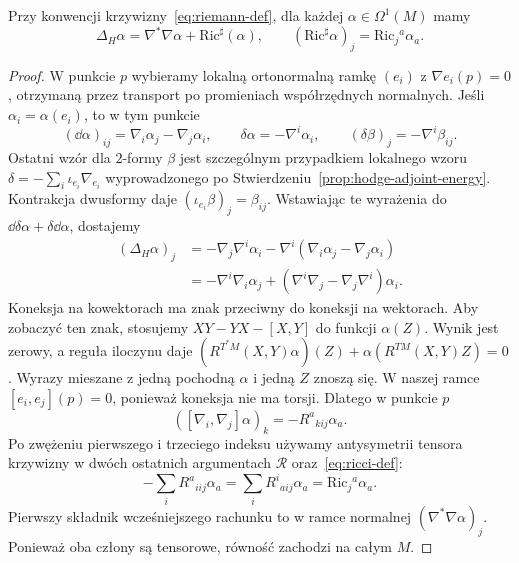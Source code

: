 \begin{twierdzenie}
\label{thm:weitzenbock-one-forms}
Przy konwencji krzywizny~\eqref{eq:riemann-def},
dla każdej $\alpha\in\Omega^1(M)$ mamy
\begin{equation}\label{eq:weitzenbock-one-forms}
 \Delta_H\alpha=\nabla^*\nabla\alpha
                      +\mathrm{Ric}^{\sharp}(\alpha),
 \qquad
 (\mathrm{Ric}^{\sharp}\alpha)_j
   =\mathrm{Ric}_j{}^a\alpha_a.
\end{equation}
\end{twierdzenie}
\begin{proof}
W punkcie $p$ wybieramy lokalną ortonormalną ramkę
$(e_i)$ z $\nabla e_i(p)=0$, otrzymaną przez transport
po promieniach współrzędnych normalnych.
Jeśli
$\alpha_i=\alpha(e_i)$, to w tym punkcie
\[
 (\dd\alpha)_{ij}=\nabla_i\alpha_j-\nabla_j\alpha_i,
 \qquad \delta\alpha=-\nabla^i\alpha_i,
 \qquad (\delta\beta)_j=-\nabla^i\beta_{ij}.
\]
Ostatni wzór dla $2$-formy $\beta$ jest szczególnym przypadkiem
lokalnego wzoru $\delta=-\sum_i\iota_{e_i}\nabla_{e_i}$
wyprowadzonego po Stwierdzeniu~\ref{prop:hodge-adjoint-energy}.
Kontrakcja dwusformy daje $(\iota_{e_i}\beta)_j=\beta_{ij}$.
Wstawiając te wyrażenia do
$\dd\delta\alpha+\delta\dd\alpha$, dostajemy
\begin{align*}
 (\Delta_H\alpha)_j
 &=-\nabla_j\nabla^i\alpha_i
   -\nabla^i(\nabla_i\alpha_j-\nabla_j\alpha_i)\\
 &=-\nabla^i\nabla_i\alpha_j
   +(\nabla^i\nabla_j-\nabla_j\nabla^i)\alpha_i.
\end{align*}
Koneksja na kowektorach ma znak przeciwny do koneksji
na wektorach. Aby zobaczyć ten znak, stosujemy
$XY-YX-[X,Y]$ do funkcji $\alpha(Z)$.
Wynik jest zerowy, a reguła iloczynu daje
$(R^{T^*M}(X,Y)\alpha)(Z)+\alpha(R^{TM}(X,Y)Z)=0$.
Wyrazy mieszane z jedną pochodną $\alpha$ i jedną $Z$ znoszą się.
W naszej ramce $[e_i,e_j](p)=0$, ponieważ koneksja nie ma torsji.
Dlatego w punkcie $p$
\[
 ([\nabla_i,\nabla_j]\alpha)_k
 =-R^a{}_{kij}\alpha_a.
\]
Po zwężeniu pierwszego i trzeciego indeksu używamy
antysymetrii tensora krzywizny w dwóch ostatnich
argumentach $\mathcal R$ oraz~\eqref{eq:ricci-def}:
\[
 -\sum_i R^a{}_{iij}\alpha_a
 =\sum_iR^i{}_{aij}\alpha_a
 =\mathrm{Ric}_j{}^a\alpha_a.
\]
Pierwszy składnik wcześniejszego rachunku to w ramce
normalnej $(\nabla^*\nabla\alpha)_j$. Ponieważ oba
człony są tensorowe, równość zachodzi na całym $M$.
\end{proof}

